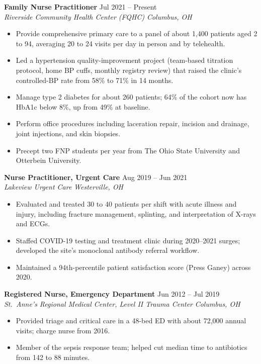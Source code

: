 \documentclass[10pt,letterpaper]{article}
\newcommand{\cventry}[4]{%
  \textbf{#1} \hfill #2\\
  \textit{#3} \hfill \textit{#4}\par\vspace{1pt}%
}
\begin{document}
\cventry{Family Nurse Practitioner}{Jul 2021 -- Present}{Riverside Community Health Center (FQHC)}{Columbus, OH}
\begin{itemize}
  \item Provide comprehensive primary care to a panel of about 1,400 patients aged 2 to 94, averaging 20 to 24 visits per day in person and by telehealth.
  \item Led a hypertension quality-improvement project (team-based titration protocol, home BP cuffs, monthly registry review) that raised the clinic's controlled-BP rate from 58\% to 71\% in 14 months.
  \item Manage type 2 diabetes for about 260 patients; 64\% of the cohort now has HbA1c below 8\%, up from 49\% at baseline.
  \item Perform office procedures including laceration repair, incision and drainage, joint injections, and skin biopsies.
  \item Precept two FNP students per year from The Ohio State University and Otterbein University.
\end{itemize}

\cventry{Nurse Practitioner, Urgent Care}{Aug 2019 -- Jun 2021}{Lakeview Urgent Care}{Westerville, OH}
\begin{itemize}
  \item Evaluated and treated 30 to 40 patients per shift with acute illness and injury, including fracture management, splinting, and interpretation of X-rays and ECGs.
  \item Staffed COVID-19 testing and treatment clinic during 2020--2021 surges; developed the site's monoclonal antibody referral workflow.
  \item Maintained a 94th-percentile patient satisfaction score (Press Ganey) across 2020.
\end{itemize}

\cventry{Registered Nurse, Emergency Department}{Jun 2012 -- Jul 2019}{St.\ Anne's Regional Medical Center, Level II Trauma Center}{Columbus, OH}
\begin{itemize}
  \item Provided triage and critical care in a 48-bed ED with about 72,000 annual visits; charge nurse from 2016.
  \item Member of the sepsis response team; helped cut median time to antibiotics from 142 to 88 minutes.
\end{itemize}

\end{document}
